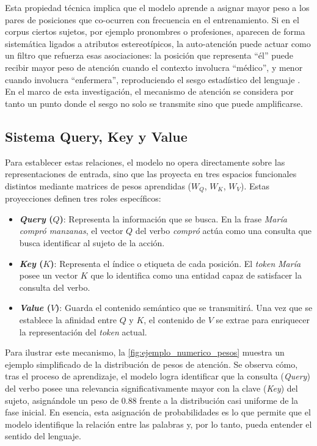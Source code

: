\documentclass[12pt,a4paper]{report}
\begin{document}
Esta propiedad técnica implica que el modelo aprende a asignar mayor peso a los pares de posiciones que co-ocurren con frecuencia en el entrenamiento. Si en el corpus ciertos sujetos, por ejemplo pronombres o profesiones, aparecen de forma sistemática ligados a atributos estereotípicos, la auto-atención puede actuar como un filtro que refuerza esas asociaciones: la posición que representa ``él'' puede recibir mayor peso de atención cuando el contexto involucra ``médico'', y menor cuando involucra ``enfermera'', reproduciendo el sesgo estadístico del lenguaje \cite{vaswani_attention_2017}. En el marco de esta investigación, el mecanismo de atención se considera por tanto un punto donde el sesgo no solo se transmite sino que puede amplificarse.

\subsection{Sistema Query, Key y Value}
\label{subsec:qkv}

Para establecer estas relaciones, el modelo no opera directamente sobre las representaciones de entrada, sino que las proyecta en tres espacios funcionales distintos mediante matrices de pesos aprendidas ($W_Q$, $W_K$, $W_V$). Estas proyecciones definen tres roles específicos:

\begin{itemize}
    \item \textbf{\textit{Query} ($Q$)}: Representa la información que se busca. En la frase \emph{María compró manzanas}, el vector $Q$ del verbo \emph{compró} actúa como una consulta que busca identificar al sujeto de la acción.
    \item \textbf{\textit{Key} ($K$)}: Representa el índice o etiqueta de cada posición. El \textit{token} \emph{María} posee un vector $K$ que lo identifica como una entidad capaz de satisfacer la consulta del verbo.
    \item \textbf{\textit{Value} ($V$)}: Guarda el contenido semántico que se transmitirá. Una vez que se establece la afinidad entre $Q$ y $K$, el contenido de $V$ se extrae para enriquecer la representación del \textit{token} actual.
\end{itemize}

Para ilustrar este mecanismo, la \autoref{fig:ejemplo_numerico_pesos} muestra un ejemplo simplificado de la distribución 
de pesos de atención. Se observa cómo, tras el proceso de aprendizaje, el modelo logra identificar que la consulta (\textit{Query}) del verbo posee una relevancia significativamente mayor con la clave (\textit{Key}) del sujeto, asignándole un peso de 0.88 frente a la distribución casi uniforme de la fase inicial. En esencia, esta asignación de probabilidades es lo que permite que el modelo identifique la relación entre las palabras y, por lo tanto, pueda entender el sentido del lenguaje.
\end{document}
